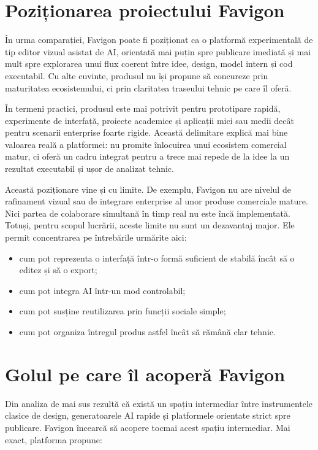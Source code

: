 \section{Poziționarea proiectului Favigon}

În urma comparației, Favigon poate fi poziționat ca o platformă experimentală de tip editor vizual asistat de AI, orientată mai puțin spre publicare imediată și mai mult spre explorarea unui flux coerent între idee, design, model intern și cod executabil. Cu alte cuvinte, produsul nu își propune să concureze prin maturitatea ecosistemului, ci prin claritatea traseului tehnic pe care îl oferă.

În termeni practici, produsul este mai potrivit pentru prototipare rapidă, experimente de interfață, proiecte academice și aplicații mici sau medii decât pentru scenarii enterprise foarte rigide. Această delimitare explică mai bine valoarea reală a platformei: nu promite înlocuirea unui ecosistem comercial matur, ci oferă un cadru integrat pentru a trece mai repede de la idee la un rezultat executabil și ușor de analizat tehnic.

Această poziționare vine și cu limite. De exemplu, Favigon nu are nivelul de rafinament vizual sau de integrare enterprise al unor produse comerciale mature. Nici partea de colaborare simultană în timp real nu este încă implementată. Totuși, pentru scopul lucrării, aceste limite nu sunt un dezavantaj major. Ele permit concentrarea pe întrebările urmărite aici:

\begin{itemize}[leftmargin=1.5cm]
  \item cum pot reprezenta o interfață într-o formă suficient de stabilă încât să o editez și să o export;
  \item cum pot integra AI într-un mod controlabil;
  \item cum pot susține reutilizarea prin funcții sociale simple;
  \item cum pot organiza întregul produs astfel încât să rămână clar tehnic.
\end{itemize}

\section{Golul pe care îl acoperă Favigon}

Din analiza de mai sus rezultă că există un spațiu intermediar între instrumentele clasice de design, generatoarele AI rapide și platformele orientate strict spre publicare. Favigon încearcă să acopere tocmai acest spațiu intermediar. Mai exact, platforma propune:

